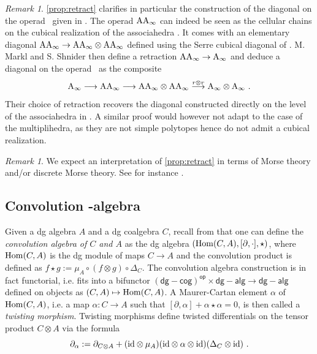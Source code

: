 \documentclass[twoside, 11pt]{amsart}
\theoremstyle{remark}
\newtheorem{remark}[definition]{\sc Remark}
\begin{document}
\begin{remark}
\cref{prop:retract} clarifies in particular the construction of the diagonal on the operad \Ainf\ given in \cite{MarklShnider06}. 
The operad $\mathrm{AA}_\infty$ can indeed be seen as the cellular chains on the cubical realization of the associahedra \cite[Section 9.3.1]{LodayVallette12}. 
It comes with an elementary diagonal $\mathrm{AA}_\infty \rightarrow \mathrm{AA}_\infty \otimes \mathrm{AA}_\infty$ defined using the Serre cubical diagonal of \cite{Serre51}.
M. Markl and S. Shnider then define a retraction $\mathrm{AA}_\infty \rightarrow \mathrm{A}_\infty$ and deduce a diagonal on the operad \Ainf\ as the composite
\[ \mathrm{A}_\infty \longrightarrow \mathrm{AA}_\infty \longrightarrow \mathrm{AA}_\infty \otimes \mathrm{AA}_\infty \overset{r \otimes r}{\longrightarrow} \mathrm{A}_\infty \otimes \mathrm{A}_\infty \ . \]
Their choice of retraction recovers the diagonal constructed directly on the level of the associahedra in \cite[Theorem 2]{MTTV19}.
A similar proof would however not adapt to the case of the multiplihedra, as they are not simple polytopes hence do not admit a cubical realization.
\end{remark}

\begin{remark}
We expect an interpretation of \cref{prop:retract} in terms of Morse theory and/or discrete Morse theory. See for instance .
\end{remark}

\subsection{Convolution \Ainf -algebra} \label{ss:conv-ainf-alg}

Given a dg algebra $A$ and a dg coalgebra $C$, recall from  \cite[Section 1.6]{LodayVallette12} that one can define the \textit{convolution algebra of $C$ and $A$} as the dg algebra $(\mathrm{Hom} (C,A) , [ \partial , \cdot ] , \star)$, where $\mathrm{Hom} (C,A)$
is the dg module of maps $C \rightarrow A$ and the convolution product is defined as $f \star g := \mu_A \circ ( f \otimes g) \circ \Delta_C$. The convolution algebra construction is in fact functorial, i.e. fits into a bifunctor $\mathsf{(dg-cog)^{op}} \times \mathsf{dg-alg} \rightarrow \mathsf{dg-alg}$ defined on objects as $(C,A) \mapsto \mathrm{Hom} (C,A)$.
A Maurer-Cartan element $\alpha$ of $\mathrm{Hom} (C,A)$, i.e. a map $\alpha : C \rightarrow A$ such that 
$[ \partial , \alpha ] + \alpha \star \alpha  = 0$,
is then called a \emph{twisting morphism}. 
Twisting morphisms define twisted differentials on the tensor product $C \otimes A$ via the formula
\[ \partial_\alpha := \partial_{C \otimes A} + (\mathrm{id} \otimes \mu_A ) ( \mathrm{id} \otimes \alpha \otimes \mathrm{id} ) ( \Delta_C \otimes \mathrm{id} ) \ . \]
\end{document}
